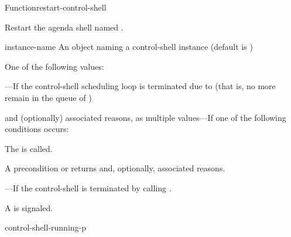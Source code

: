 \documentclass[10pt,twoside,english,pdftex]{article}
\begin{document}
\begin{functiondoc}{Function}{restart-control-shell}{%
     
    \returns{} \superstar}
%
%
%

\fnsyntax

\fnpurpose Restart the agenda shell named .

\fnpackage {}

\fnmodule {}

%
\fnargs
\begin{args}{instance-name}
 An object naming a control-shell instance (default is 
) 
\end{args}

\fnreturns
One of the following values: 
\begin{tightitemize}
\item {}---If the control-shell scheduling loop is terminated
  due to  (that is, no more  remain 
  in the queue of ) 
\item {} and (optionally) associated reasons, as multiple
  values---If one of the following conditions occurs:
\begin{tightitemize}
\item The \textbf{}  is
  called.
\item A precondition  or  
  returns  and, optionally, associated reasons.
\end{tightitemize}
\item {}---If the control-shell is terminated by
  calling \textbf{}.
\end{tightitemize}

\fnevents
{}%
%
%
%
%
%
A  is signaled.
 
\fnerrors
\threadsnotstarted

\begin{alsos}{control-shell-running-p}
\end{alsos}


\end{functiondoc}
\end{document}
